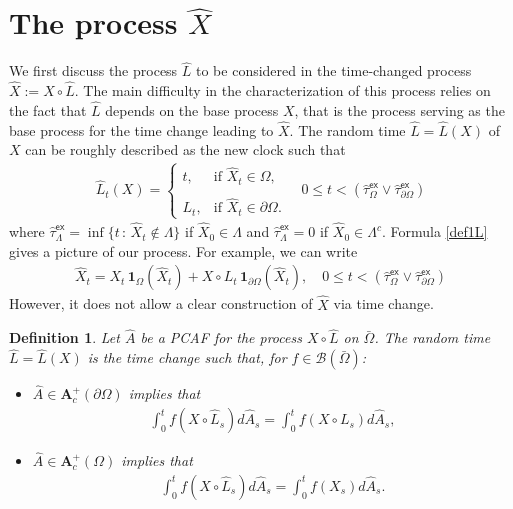 \documentclass[11pt,a4paper]{article}
\newtheorem{definition}{Definition}
\begin{document}
\section{The process $\hat{X}$}
\label{sec:hatX}


We first discuss the process $\hat{L}$ to be considered in the time-changed process $\hat{X} := X \circ \hat{L}$. The main difficulty in the characterization of this process relies on the fact that $\hat{L}$ depends on the base process $X$, that is the process serving as the base process for the time change leading to $\hat{X}$. The random time $\hat{L} = \hat{L}(X)$ of $X$ can be roughly described as the new clock such that
\begin{align}
\hat{L}_t(X) = \left\lbrace
\begin{array}{ll}
\displaystyle t, &  \textrm{if  } \hat{X}_t \in \Omega,\\
\\ 
\displaystyle L_t, & \textrm{if } \hat{X}_t \in \partial \Omega.
\end{array}
\right. \quad  0 \leq t < (\hat{\tau}^\mathsf{ex}_\Omega \vee \hat{\tau}^\mathsf{ex}_{\partial \Omega})
\label{def1L}
\end{align}
where $\hat{\tau}^\mathsf{ex}_\Lambda = \inf\{t\,:\, \hat{X}_t \notin \Lambda \}$ if $\hat{X}_0 \in \Lambda$ and $\hat{\tau}^\mathsf{ex}_\Lambda = 0$ if $\hat{X}_0 \in \Lambda^c$. Formula \eqref{def1L} gives a picture of our process. For example, we can write
\begin{align*}
\hat{X}_t = X_t \, \mathbf{1}_{\Omega} (\hat{X}_t) + X \circ L_t\, \mathbf{1}_{\partial \Omega} (\hat{X}_t), \quad 0 \leq t < (\hat{\tau}^\mathsf{ex}_\Omega \vee \hat{\tau}^\mathsf{ex}_{\partial \Omega})
\end{align*}
However, it does not allow a clear construction of $\hat{X}$ via time change. \begin{definition}
\label{defLhat}
Let $\hat{A}$ be a PCAF for the process $X \circ \hat{L}$ on $\bar{\Omega}$. The random time $\hat{L}=\hat{L}(X)$ is the time change such that, for $f \in \mathcal{B}(\bar{\Omega})$:
\begin{itemize}
\item[i)] $\hat{A} \in \mathbf{A}^+_c(\partial \Omega) $ implies that
\begin{align}
\label{defLhatbyA1}
\int_0^t f(X\circ \hat{L}_s) d\hat{A}_s = \int_0^t f(X \circ L_s)d\hat{A}_s, 
\end{align}
\item[ii)] $\hat{A} \in \mathbf{A}^+_c(\Omega)$ implies that
\begin{align}
\int_0^t f(X\circ \hat{L}_s) d\hat{A}_s = \int_0^t f(X_s)d\hat{A}_s.
\end{align}
\end{itemize}
\end{definition}
\end{document}
